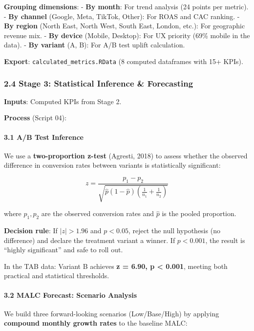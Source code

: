 \documentclass[
  11pt,
]{article}
\begin{document}
\textbf{Grouping dimensions}: - \textbf{By month}: For trend analysis
(24 points per metric). - \textbf{By channel} (Google, Meta, TikTok,
Other): For ROAS and CAC ranking. - \textbf{By region} (North East,
North West, South East, London, etc.): For geographic revenue mix. -
\textbf{By device} (Mobile, Desktop): For UX priority (69\% mobile in
the data). - \textbf{By variant} (A, B): For A/B test uplift
calculation.

\textbf{Export}: \texttt{calculated\_metrics.RData} (8 computed
dataframes with 15+ KPIs).

\subsubsection{2.4 Stage 3: Statistical Inference \&
Forecasting}\label{stage-3-statistical-inference-forecasting}

\textbf{Inputs}: Computed KPIs from Stage 2.

\textbf{Process} (Script 04):

\paragraph{3.1 A/B Test Inference}\label{ab-test-inference}

We use a \textbf{two-proportion z-test} (Agresti, 2018) to assess
whether the observed difference in conversion rates between variants is
statistically significant:

\[z = \frac{p_1 - p_2}{\sqrt{\hat{p}(1-\hat{p}) \left(\frac{1}{n_1} + \frac{1}{n_2}\right)}}\]

where \(p_1, p_2\) are the observed conversion rates and \(\hat{p}\) is
the pooled proportion.

\textbf{Decision rule}: If \(|z| > 1.96\) and \(p < 0.05\), reject the
null hypothesis (no difference) and declare the treatment variant a
winner. If \(p < 0.001\), the result is ``highly significant'' and safe
to roll out.

In the TAB data: Variant B achieves \textbf{z = 6.90, p \textless{}
0.001}, meeting both practical and statistical thresholds.

\paragraph{3.2 MALC Forecast: Scenario
Analysis}\label{malc-forecast-scenario-analysis}

We build three forward-looking scenarios (Low/Base/High) by applying
\textbf{compound monthly growth rates} to the baseline MALC:
\end{document}

